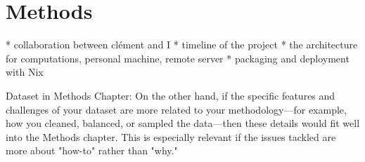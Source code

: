 \chapter{Methods}\label{chap:methods}


* collaboration between clément and I
* timeline of the project
* the architecture for computations, personal machine, remote server
* packaging and deployment with Nix

Dataset in Methods Chapter: On the other hand, if the specific features and challenges of your dataset are more related to your methodology—for example, how you cleaned, balanced, or sampled the data—then these details would fit well into the Methods chapter. This is especially relevant if the issues tackled are more about "how-to" rather than "why."

